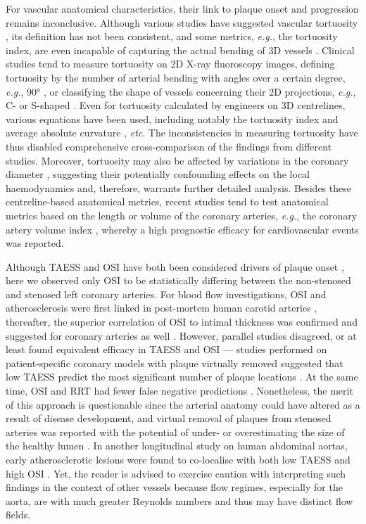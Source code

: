 \documentclass[preprint,11pt,review]{elsarticle}
\begin{document}
For vascular anatomical characteristics, their link to plaque onset and progression remains inconclusive. Although various studies have suggested vascular tortuosity \cite{Liu2015Hemodynamic,Peng2016Impact}, its definition has not been consistent, and some metrics, \textit{e.g.}, the tortuosity index, are even incapable of capturing the actual bending of 3D vessels \cite{Kashyap2022Accuracy}. Clinical studies tend to measure tortuosity on 2D X-ray fluoroscopy images, defining tortuosity by the number of arterial bending with angles over a certain degree, \textit{e.g.}, 90° \cite{Han2022Association}, or classifying the shape of vessels concerning their 2D projections, \textit{e.g.}, C- or S-shaped \cite{Altintas2020Influence}. Even for tortuosity calculated by engineers on 3D centrelines, various equations have been used, including notably the tortuosity index \cite{Malvè2015Tortuosity} and average absolute curvature \cite{Hart1997Automated}, \textit{etc}. The inconsistencies in measuring tortuosity have thus disabled comprehensive cross-comparison of the findings from different studies. Moreover, tortuosity may also be affected by variations in the coronary diameter \cite{Shen2022Effect}, suggesting their potentially confounding effects on the local haemodynamics and, therefore, warrants further detailed analysis. Besides these centreline-based anatomical metrics, recent studies tend to test anatomical metrics based on the length or volume of the coronary arteries, \textit{e.g.}, the coronary artery volume index \cite{Benetos2020Coronary}, whereby a high prognostic efficacy for cardiovascular events was reported. 

Although TAESS and OSI have both been considered drivers of plaque onset \cite{Peiffer2013Does}, here we observed only OSI to be statistically differing between the non-stenosed and stenosed left coronary arteries. For blood flow investigations, OSI and atherosclerosis were first linked in post-mortem human carotid arteries \cite{Ku1985Pulsatile}, thereafter, the superior correlation of OSI to intimal thickness was confirmed and suggested for coronary arteries as well \cite{Hoi2011Correlation,xu_improvement_2020}. However, parallel studies disagreed, or at least found equivalent efficacy in TAESS and OSI — studies performed on patient-specific coronary models with plaque virtually removed suggested that low TAESS predict the most significant number of plaque locations \cite{Knight2010Choosing}. At the same time, OSI and RRT had fewer false negative predictions \cite{Rikhtegar2012Choosing}. Nonetheless, the merit of this approach is questionable since the arterial anatomy could have altered as a result of disease development, and virtual removal of plaques from stenosed arteries was reported with the potential of under- or overestimating the size of the healthy lumen \cite{Peiffer2013Does}. In another longitudinal study on human abdominal aortas, early atherosclerotic lesions were found to co-localise with both low TAESS and high OSI \cite{Buchanan2003Hemodynamics}. Yet, the reader is advised to exercise caution with interpreting such findings in the context of other vessels because flow regimes, especially for the aorta, are with much greater Reynolds numbers and thus may have distinct flow fields. 
\end{document}
